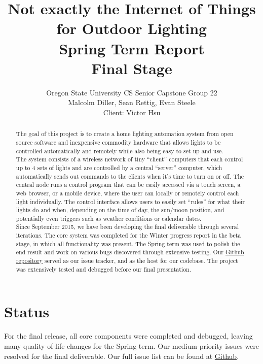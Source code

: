 \documentclass[10pt,draftclsnofoot,onecolumn]{IEEEtran}
\title{Not exactly the Internet of Things for Outdoor Lighting\\ Spring Term Report\\ Final Stage}
\author{Oregon State University CS Senior Capstone Group 22\\Malcolm Diller, Sean Rettig, Evan Steele\\Client: Victor Hsu}
\begin{document}
\maketitle
\begin{abstract}
The goal of this project is to create a home lighting automation system from
open source software and inexpensive commodity hardware that allows lights to
be controlled automatically and remotely while also being easy to set up and
use.\\

The system consists of a wireless network of tiny ``client'' computers that
each control up to 4 sets of lights and are controlled by a central ``server''
computer, which automatically sends out commands to the clients when it's
time to turn on or off.  The central node runs a control program that can
be easily accessed via a touch screen, a web browser, or a mobile device, where
the user can locally or remotely control each light individually. The control
interface allows users to easily set ``rules'' for what their lights do and
when, depending on the time of day, the sun/moon position, and potentially even
triggers such as weather conditions or calendar dates.\\

Since September 2015, we have been developing the final deliverable through several 
iterations. The core system was completed for the Winter progress report in the beta
stage, in which all functionality was present. The Spring term was used to polish the 
end result and work on various bugs discovered through extensive testing. Our \href{https://github.com/rettigs/cs-senior-capstone}{Github repository} served as our issue tracker, and as the host for our codebase. 
The project was extensively tested and debugged before our final presentation.
\end{abstract}
\pagebreak
\tableofcontents
\newpage

\section{Status}
For the final release, all core components were completed and debugged,
leaving many quality-of-life changes for the Spring term. Our medium-priority issues
were resolved for the final
deliverable. Our full issue list can be 
found at \href{https://github.com/rettigs/cs-senior-capstone/issues}{Github}.
\end{document}
